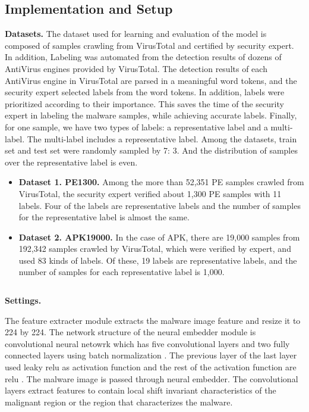 \subsection{Implementation and Setup}
\textbf{Datasets. } 
The dataset used for learning and evaluation of the model is composed of samples crawling from VirusTotal \cite{total2012virustotal} and certified by security expert. In addition, Labeling was automated from the detection results of dozens of AntiVirus engines provided by VirusTotal. The detection results of each AntiVirus engine in VirusTotal are parsed in a meaningful word tokens, and the security expert selected labels from the word tokens. In addition, labels were prioritized according to their importance. This saves the time of the security expert in labeling the malware samples, while achieving accurate labels. Finally, for one sample, we have two types of labels: a representative label and a multi-label. The multi-label includes a representative label. Among the datasets, train set and test set were randomly sampled by 7: 3. And the distribution of samples over the representative label is even.

\begin{itemize}
	\item{ \textbf{Dataset 1. PE1300. } Among the more than 52,351 PE samples crawled from VirusTotal, the security expert verified about 1,300 PE samples with 11 labels. Four of the labels are representative labels and the number of samples for the representative label is almost the same.
	}
	\item{ \textbf{Dataset 2. APK19000. } In the case of APK, there are 19,000 samples from 192,342 samples crawled by VirusTotal, which were verified by expert, and used 83 kinds of labels. Of these, 19 labels are representative labels, and the number of samples for each representative label is 1,000.
	}
\end{itemize}

$ $

\textbf{Settings. }

The feature extracter module extracts the malware image feature \cite{nataraj2011malware} and resize it to 224 by 224.
The network structure of the neural embedder module is convolutional neural netowrk which has five convolutional layers and two fully connected layers using batch normalization \cite{ioffe2015batch}. The previous layer of the last layer used leaky relu \cite{xu2015empirical} as activation function and the rest of the activation function are relu \cite{nair2010rectified}. 
The malware image \cite{nataraj2011malware} is passed through neural embedder. The convolutional layers extract features to contain local shift invariant characteristics of the malignant region or the region that characterizes the malware.

